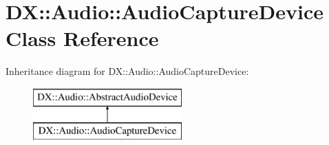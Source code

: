 \hypertarget{class_d_x_1_1_audio_1_1_audio_capture_device}{\section{D\-X\-:\-:Audio\-:\-:Audio\-Capture\-Device Class Reference}
\label{class_d_x_1_1_audio_1_1_audio_capture_device}
}
Inheritance diagram for D\-X\-:\-:Audio\-:\-:Audio\-Capture\-Device\-:\begin{figure}[H]
\begin{center}
\leavevmode
\includegraphics[height=2.000000cm]{class_d_x_1_1_audio_1_1_audio_capture_device}
\end{center}
\end{figure}
